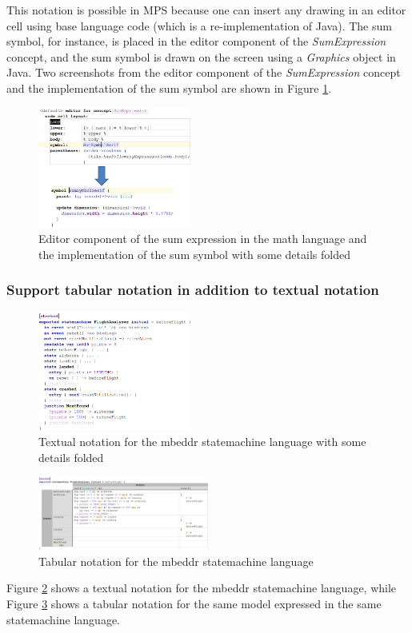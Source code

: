 \documentclass[preprint,numbers,10pt]{sigplanconf}
\begin{document}
This notation is possible in MPS because one can insert any drawing in an editor cell using base language code (which is a re-implementation of Java).
The sum symbol, for instance, is placed in the editor component of the \emph{SumExpression} concept,
and the sum symbol is drawn on the screen using a \emph{Graphics} object in Java. Two screenshots from
the editor component of the \emph{SumExpression} concept and the implementation of the sum symbol
are shown in Figure \ref{fig:MathSymbolImpl}.

\begin{figure}[H]
	\centering
	\includegraphics[width=0.45\textwidth]{screens/MathSymbolImpl.png}
	\caption{Editor component of the sum expression in the math language and the implementation
of the sum symbol with some details folded}
	\label{fig:MathSymbolImpl}
\end{figure}

\subsubsection{Support tabular notation in addition to textual notation}\label{sec:tabnot}
\begin{figure}[H]
	\centering
	\includegraphics[width=0.45\textwidth]{screens/TextualNotationStatemachine.png}
	\caption{Textual notation for the mbeddr statemachine language with some details folded}
	\label{fig:txtnotationsm}
\end{figure}
\begin{figure}[H]
	\centering
	\includegraphics[width=0.50\textwidth]{screens/TabularNotationStatemachines.png}
	\caption{Tabular notation for the mbeddr statemachine language}
	\label{fig:tabnotationsm}
\end{figure}
Figure \ref{fig:txtnotationsm} shows a textual notation for the mbeddr statemachine language,
while Figure \ref{fig:tabnotationsm} shows a tabular notation for the same model expressed in the same statemachine language.
\end{document}
